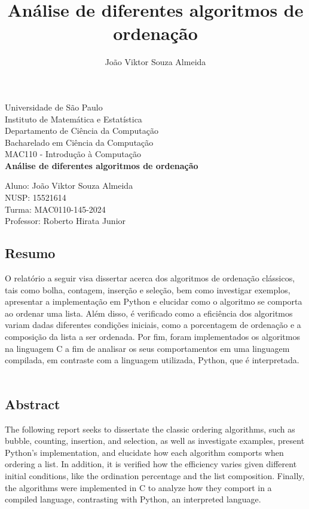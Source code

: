 \documentclass[10pt,a4paper]{article}
\author{João Viktor Souza Almeida}
\title{Análise de diferentes algoritmos de ordenação}
\begin{document}
\begin{titlepage} %
    \begin{center} %
    {\large Universidade de São Paulo}\\[0.2cm] %
    {\large Instituto de Matemática e Estatística}\\[0.2cm] %
    {\large Departamento de Ciência da Computação}\\[0.2cm]
    {\large Bacharelado em Ciência da Computação}\\[0.2cm]
    {\large MAC110 - Introdução à Computação}\\[5.1cm]
    {\bf \huge Análise de diferentes algoritmos de ordenação}\\[5.1cm] 
    \end{center} %
    {\large Aluno: João Viktor Souza Almeida}\\[0.7cm] %
    {\large NUSP: 15521614}\\[0.7cm] %
    {\large Turma: MAC0110-145-2024}\\[0.7cm] %
    {\large Professor: Roberto Hirata Junior}\\[5.1cm]
    \end{titlepage} %

\subsection*{Resumo}
O relatório a seguir visa dissertar acerca dos algoritmos de ordenação clássicos, tais como bolha, contagem, inserção e seleção, bem como investigar exemplos, apresentar a implementação em Python e elucidar como o algoritmo se comporta ao ordenar uma lista.
Além disso, é verificado como a eficiência dos algoritmos variam dadas diferentes condições iniciais, como a porcentagem de ordenação e a composição da lista a ser ordenada. 
Por fim, foram implementados os algoritmos na linguagem C a fim de analisar os seus comportamentos em uma linguagem compilada, em contraste com a linguagem utilizada, Python, que é interpretada.
\

\subsection*{Abstract}
The following report seeks to dissertate the classic ordering algorithms, such as bubble, counting, insertion, and selection, as well as investigate examples, present Python's implementation, and elucidate how each algorithm comports when ordering a list.
In addition, it is verified how the efficiency varies given different initial conditions, like the ordination percentage and the list composition.
Finally, the algorithms were implemented in C to analyze how they comport in a compiled language, contrasting with Python, an interpreted language.
\end{document}
